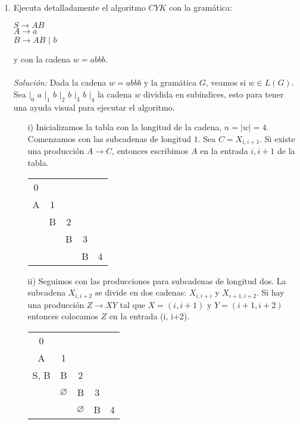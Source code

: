 \documentclass[letterpaper,11pt]{article}
\begin{document}
\begin{enumerate}
        \item Ejecuta detalladamente el algoritmo $CYK$ con la gramática:
        \begin{center}
            $S \rightarrow AB$ \\
            $A \rightarrow a$ \\ 
            $B \rightarrow AB$ $|$ $b$
        \end{center}
        y con la cadena $w = abbb$.\\ \\
        \textit{Solución:} Dada la cadena $w = abbb$ y la gramática $G$, veamos
        si $w \in L(G)$. \\
        Sea $|_{0}$ $a$ $|_1$ $b$ $|_2$ $b$ $|_3$ $b$ $|_4$ la cadena $w$
        dividida en subíndices, esto para tener una ayuda visual para ejecutar 
        el algoritmo.
        \begin{itemize}
            \item[i)] Inicializamos la tabla con la longitud de la cadena, 
            $n = |w| = 4$. Comenzamos con las subcadenas de longitud $1$. Sea
            $C = X_{i, i+1}$. Si existe una producción $A \rightarrow C$, 
            entonces escribimos $A$ en la entrada $i, i+1$ de la tabla.
            \begin{center}
                \begin{tabular}{c | c | c| c | c}
                     0   \\
                     A & 1  \\
                     & B & 2 \\
                     & & B & 3 \\
                     & & & B & 4\\
                     \hline
                \end{tabular}
            \end{center}
            
            \item[ii)] Seguimos con las producciones para subcadenas de 
            longitud dos. La subcadena $X_{i, i+2}$ se divide en dos cadenas:
            $X_{i, i+i}$ y $X_{i+1, i+2}$. Si hay una producción 
            $Z \rightarrow XY$ tal que $X = (i, i+1)$ y $Y =(i+1, i+2)$
            entonces colocamos $Z$ en la entrada (i, i+2).
            \begin{center}
                \begin{tabular}{c | c | c| c | c}
                     0   \\
                     A & 1  \\
                     S, B & B & 2 \\
                     & $\varnothing$ & B & 3 \\
                     & & $\varnothing$ & B & 4\\
                     \hline
                \end{tabular}
            \end{center}
            

\end{itemize}
\end{enumerate}
\end{document}
